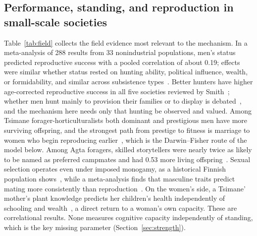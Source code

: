\subsection{Performance, standing, and reproduction in small-scale societies}

Table~\ref{tab:field} collects the field evidence most relevant to the mechanism. In a meta-analysis of 288 results from 33
nonindustrial populations, men's status predicted reproductive success with a pooled correlation of about 0.19; effects were
similar whether status rested on hunting ability, political influence, wealth, or formidability, and similar across
subsistence types~\cite{vonrueden2016}. Better hunters have higher age-corrected reproductive success in all five societies
reviewed by Smith~\cite{smith2004}; whether men hunt mainly to provision their families or to display is
debated~\cite{hawkes2002,gurvenhill2009}, and the mechanism here needs only that hunting be observed and valued. Among Tsimane forager-horticulturalists both dominant and prestigious men have more
surviving offspring, and the strongest path from prestige to fitness is marriage to women who begin reproducing
earlier~\cite{vonrueden2011}, which is the Darwin--Fisher route of the model below. Among Agta foragers, skilled storytellers
were nearly twice as likely to be named as preferred campmates and had 0.53 more living offspring~\cite{smith2017}. Sexual
selection operates even under imposed monogamy, as a historical Finnish population shows~\cite{courtiol2012}, while a
meta-analysis finds that masculine traits predict mating more consistently than reproduction~\cite{lidborg2022}. On the
women's side, a Tsimane' mother's plant knowledge predicts her children's health independently of schooling and
wealth~\cite{mcdade2007}, a direct return to a woman's own capacity. These are correlational results. None measures cognitive
capacity independently of standing, which is the key missing parameter (Section~\ref{sec:strength}).

